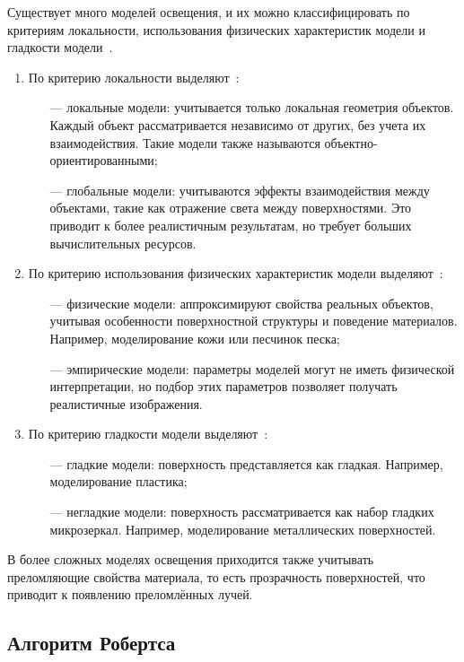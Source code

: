 Существует много моделей освещения, и их можно классифицировать по критериям локальности, использования физических характеристик модели и гладкости модели~\cite{light}.
\begin{enumerate}
	\item По критерию локальности выделяют~\cite{light}:
	\begin{itemize}
		\item[---] локальные модели: учитывается только локальная геометрия объектов. Каждый объект рассматривается независимо от других, без учета их взаимодействия. Такие модели также называются объектно-ориентированными;
	
	    \item[---] глобальные модели: учитываются эффекты взаимодействия между объектами, такие как отражение света между поверхностями. Это приводит к более реалистичным результатам, но требует больших вычислительных ресурсов.
	\end{itemize}

	\item По критерию использования физических характеристик модели выделяют~\cite{light}:
	\begin{itemize}
		\item[---] физические модели: аппроксимируют свойства реальных объектов, учитывая особенности поверхностной структуры и поведение материалов. Например, моделирование кожи или песчинок песка;
		\item[---] эмпирические модели: параметры моделей могут не иметь физической интерпретации, но подбор этих параметров позволяет получать реалистичные изображения.
	\end{itemize}
	\item По критерию гладкости модели выделяют~\cite{light}:
	\begin{itemize}
		\item[---] гладкие модели: поверхность представляется как гладкая. Например, моделирование пластика;
		\item[---] негладкие модели: поверхность рассматривается как набор гладких микрозеркал. Например, моделирование металлических поверхностей.
	\end{itemize}
\end{enumerate}

В более сложных моделях освещения приходится также учитывать преломляющие свойства материала, то есть прозрачность поверхностей, что приводит к появлению преломлённых лучей.

\subsection{Алгоритм Робертса}

